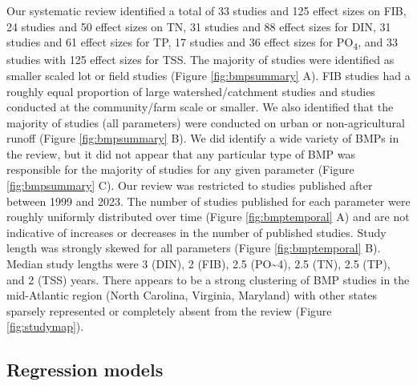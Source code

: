 \documentclass[utf8]{FrontiersinHarvard}
\begin{document}
Our systematic review identified a total of 33 studies and 125 effect sizes on FIB, 24 studies and 50 effect sizes on TN, 31 studies and 88 effect sizes for DIN, 31 studies and 61 effect sizes for TP, 17 studies and 36 effect sizes for PO\textsubscript{4}, and 33 studies with 125 effect sizes for TSS.
The majority of studies were identified as smaller scaled lot or field studies (Figure \ref{fig:bmpsummary} A).
FIB studies had a roughly equal proportion of large watershed/catchment studies and studies conducted at the community/farm scale or smaller.
We also identified that the majority of studies (all parameters) were conducted on urban or non-agricultural runoff (Figure \ref{fig:bmpsummary} B).
We did identify a wide variety of BMPs in the review, but it did not appear that any particular type of BMP was responsible for the majority of studies for any given parameter (Figure \ref{fig:bmpsummary} C).
Our review was restricted to studies published after between 1999 and 2023.
The number of studies published for each parameter were roughly uniformly distributed over time (Figure \ref{fig:bmptemporal} A) and are not indicative of increases or decreases in the number of published studies.
Study length was strongly skewed for all parameters (Figure \ref{fig:bmptemporal} B). Median study lengths were 3 (DIN), 2 (FIB), 2.5 (PO\textasciitilde4), 2.5 (TN), 2.5 (TP), and 2 (TSS) years.
There appears to be a strong clustering of BMP studies in the mid-Atlantic region (North Carolina, Virginia, Maryland) with other states sparsely represented or completely absent from the review (Figure \ref{fig:studymap}).

\hypertarget{regression-models}{%
\subsection{Regression models}\label{regression-models}}
\end{document}
